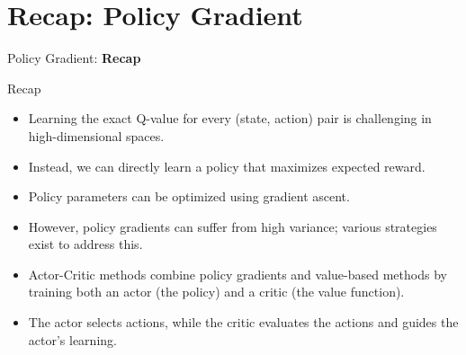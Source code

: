 \section{Recap: Policy Gradient}
\begin{frame}{}
    \LARGE Policy Gradient: \textbf{Recap}
\end{frame}

\begin{frame}{Recap}
    \begin{itemize}
        \item Learning the exact Q-value for every (state, action) pair is challenging in high-dimensional spaces.
        \item Instead, we can directly learn a policy that maximizes expected reward.
        \item Policy parameters can be optimized using gradient ascent.
        \item However, policy gradients can suffer from high variance; various strategies exist to address this.
        \item Actor-Critic methods combine policy gradients and value-based methods by training both an actor (the policy) and a critic (the value function).
        \item The actor selects actions, while the critic evaluates the actions and guides the actor's learning.
    \end{itemize}
\end{frame}